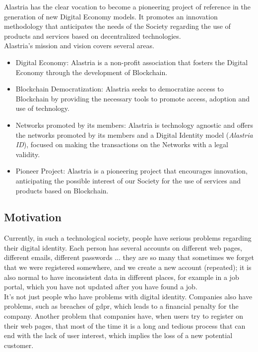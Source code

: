 \documentclass[a4paper, 12pt]{article} %
\begin{document}
            Alastria has the clear vocation to become a pioneering project of reference in the generation of new Digital Economy models. It promotes an innovation methodology that anticipates the needs of the Society regarding the use of products and services based on decentralized technologies.\\
            
            Alastria's mission and vision covers several areas.
            \begin{itemize}
                \item Digital Economy: Alastria is a non-profit association that fosters the Digital Economy through the development of Blockchain.
                \item Blockchain Democratization: Alastria seeks to democratize access to Blockchain by providing the necessary tools to promote access, adoption and use of technology.
                \item Networks promoted by its members: Alastria is technology agnostic and offers the networks promoted by its members and a Digital Identity model (\textit{Alastria ID}), focused on making the transactions on the Networks with a legal validity. 
                \item Pioneer Project: Alastria is a pioneering project that encourages innovation, anticipating the possible interest of our Society for the use of services and products based on Blockchain.
            \end{itemize}
        
        \subsection{Motivation}
            Currently, in such a technological society, people have serious problems regarding their digital identity. Each person has several accounts on different web pages, different emails, different passwords ... they are so many that sometimes we forget that we were registered somewhere, and we create a new account (repeated); it is also normal to have inconsistent data in different places, for example in a job portal, which you have not updated after you have found a job.\\
            
            It's not just people who have problems with digital identity. Companies also have problems, such as breaches of \acrshort{gdpr}, which leads to a financial penalty for the company. Another problem that companies have, when users try to register on their web pages, that most of the time it is a long and tedious process that can end with the lack of user interest, which implies the loss of a new potential customer.\\
            
\end{document}
